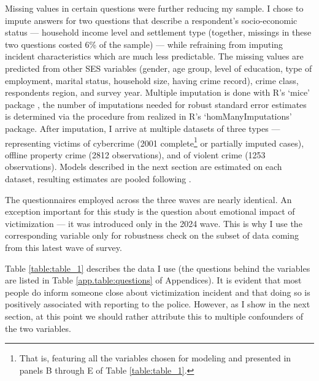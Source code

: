 \documentclass[]{interact}
\theoremstyle{plain}%
\theoremstyle{definition}
\theoremstyle{remark}
\newcommand\citep{\parencite}
\newcommand\citet{\textcite}
\begin{document}
	Missing values in certain questions were further reducing my sample. I chose to impute answers for two questions that describe a respondent's socio-economic status --- household income level and settlement type (together, missings in these two questions costed 6\% of the sample) --- while refraining from imputing incident characteristics which are much less predictable. The missing values are predicted from other SES variables (gender, age group, level of education, type of employment, marital status, household size, having crime record), crime class, respondents region, and survey year. Multiple imputation is done with R's `mice' package \citep{buuren2011mice}, the number of imputations needed for robust standard error estimates is determined via the procedure from \citet{hippel2020how} realized in R's `homManyImputations' package. After imputation, I arrive at multiple datasets of three types --- representing victims of cybercrime (2001 complete\footnote{That is, featuring all the variables chosen for modeling and presented in panels B through E of Table \ref{table:table_1}.} or partially imputed cases), offline property crime (2812 observations), and of violent crime (1253 observations). Models described in the next section are estimated on each dataset, resulting estimates are pooled following \citet{barnard1999miscellanea}.
	
	The questionnaires employed across the three waves are nearly identical. %
	An exception important for this study is the question about emotional impact of victimization --- it was introduced only in the 2024 wave. This is why I use the corresponding variable only for robustness check on the subset of data coming from this latest wave of survey.
	
	Table \ref{table:table_1} describes the data I use (the questions behind the variables are listed in Table \ref{app.table:questions} of Appendices). 
	It is evident that most people do inform someone close about victimization incident and that doing so is positively associated with reporting to the police. However, as I show in the next section, at this point we should rather attribute this to multiple confounders of the two variables.
	
\end{document}
